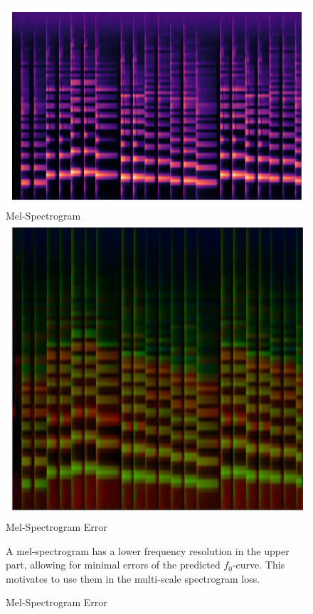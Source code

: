 \begin{figure}
\begin{minipage}[b]{0.49\textwidth}
        \centering
        \includegraphics[width=\textwidth]{figures/fine-tuning/mel/melspec.png}
        \small{\newline Mel-Spectrogram}
        \includegraphics[width=\textwidth]{figures/mss/mel-piano-untuned-cycled.png}
        \small{\newline Mel-Spectrogram Error}
    \end{minipage}
    \caption{Mel-Spectrogram Error}
    \small{A mel-spectrogram has a lower frequency resolution in the upper part, allowing for minimal errors of the predicted $f_0$-curve. This motivates to use them in the multi-scale spectrogram loss.}
    \label{fig:mel-mss}
\end{figure}



